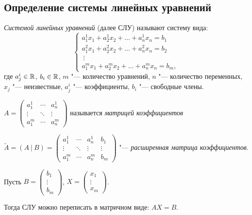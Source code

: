 \subsection*{Определение системы линейных уравнений}
\begin{definition}
    \textit{Системой линейных уравнений} (далее СЛУ) называют систему вида:
    \begin{equation}
        \label{eq:SLU}
        \begin{cases}
        a_1^1x_1 +  a_2^1x_2 + \ldots + a_n^1x_n = b_1 \\
        a_1^2x_1 +  a_2^2x_2 + \ldots + a_n^2x_n = b_2 \\
        ~\vdots \\
        a_1^mx_1 +  a_2^mx_2 + \dots + a_n^mx_n = b_m,
    \end{cases}
    \end{equation} 
    где $a_j^i \in \mathbb{R}$, $b_i \in \mathbb{R}$, $m$ "--- количество уравнений, $n$ "--- количество переменных, $x_j$ "--- неизвестные, $a_j^i$ "--- коэффициенты, $b_i$ "--- свободные члены.
\end{definition}
$A = \begin{pmatrix}
    a_1^1 & \cdots & a_n^1 \\
    \vdots & \ddots & \vdots \\
    a_1^m & \cdots & a_n^m
\end{pmatrix}$ называется \textit{матрицей коэффициентов}

$\tilde{A} = (A~|~B) =
\left({ 
\begin{array}{ccc|c}
    a_1^1 & \cdots & a_n^1 & b_1 \\
    \vdots & \ddots & \vdots & \vdots \\
    a_1^m & \cdots & a_n^m & b_m
\end{array}} \right)$ "--- \textit{расширенная матрица коэффициентов}.

Пусть $B = \begin{pmatrix}
    b_1 \\
    \vdots \\
    b_m
\end{pmatrix}$, $X = \begin{pmatrix}
    x_1 \\
    \vdots \\
    x_m
\end{pmatrix}$. 

Тогда СЛУ можно переписать в матричном виде:
$ AX = B$.

\vspace{0.2cm}

